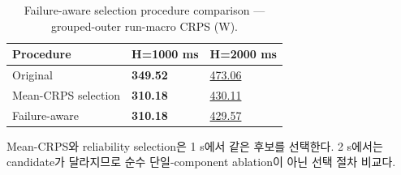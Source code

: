 \begin{table}[t]
\centering
\caption{Failure-aware selection procedure comparison — grouped-outer run-macro CRPS (W).}
\label{tab:a3c_selection_procedure}
\small
\begin{tabular}{lll}
\toprule
Procedure & H=1000 ms & H=2000 ms \\
\midrule
Original & \textbf{349.52} & \underline{473.06} \\
Mean-CRPS selection & \textbf{310.18} & \underline{430.11} \\
Failure-aware & \textbf{310.18} & \underline{429.57} \\
\bottomrule
\end{tabular}
\vspace{2pt}\par\footnotesize Mean-CRPS와 reliability selection은 1 s에서 같은 후보를 선택한다. 2 s에서는 candidate가 달라지므로 순수 단일-component ablation이 아닌 선택 절차 비교다.
\end{table}
